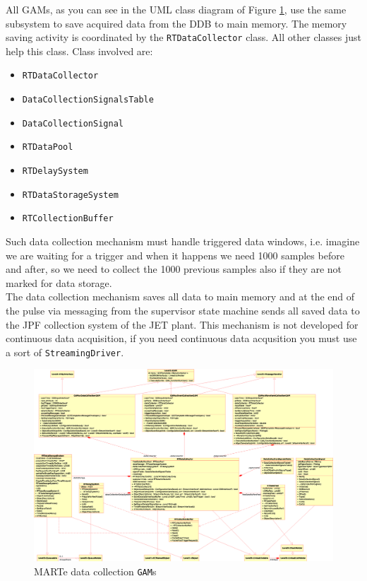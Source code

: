 All GAMs, as you can see in the UML class diagram of Figure \ref{f:MARTe:GAMs:DataCollection}, use the same subsystem to save acquired data from the DDB to main memory. The memory saving activity is coordinated by the \texttt{RTDataCollector} class. All other classes just help this class. Class involved are:
\begin{itemize}
 \item \texttt{RTDataCollector}
 \item \texttt{DataCollectionSignalsTable}
 \item \texttt{DataCollectionSignal}
 \item \texttt{RTDataPool}
 \item \texttt{RTDelaySystem}
 \item \texttt{RTDataStorageSystem}
 \item \texttt{RTCollectionBuffer}
\end{itemize}

Such data collection mechanism must handle triggered data windows, i.e. imagine we are waiting for a trigger and when it happens we need 1000 samples before and after, so we need to collect the 1000 previous samples also if they are not marked for data storage. \\


The data collection mechanism saves all data to main memory and at the end of the pulse via messaging from the supervisor state machine sends all saved data to the JPF collection system of the JET plant. This mechanism is not developed for continuous data acquisition, if you need continuous data acqusition you must use a sort of \texttt{StreamingDriver}. \\


\begin{figure}
 \centering
 \includegraphics[width=\textwidth]{MARTe/GAMs-Collection.eps}
 \caption{MARTe data collection \texttt{GAM}s}
 \label{f:MARTe:GAMs:DataCollection}
\end{figure}
\clearpage



